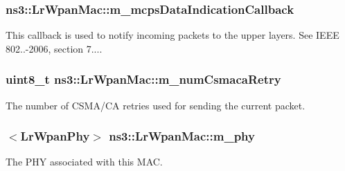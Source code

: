 \subsubsection[{\texorpdfstring{m\+\_\+mcps\+Data\+Indication\+Callback}{m_mcpsDataIndicationCallback}}]{ ns3\+::\+Lr\+Wpan\+Mac\+::m\+\_\+mcps\+Data\+Indication\+Callback\hspace{0.3cm}{\ttfamily [private]}}\hypertarget{classns3_1_1LrWpanMac_ada2124716389b849b2a1f9c8ff64d597}{}\label{classns3_1_1LrWpanMac_ada2124716389b849b2a1f9c8ff64d597}
This callback is used to notify incoming packets to the upper layers. See I\+E\+EE 802..-\/2006, section 7.... 
\subsubsection[{\texorpdfstring{m\+\_\+num\+Csmaca\+Retry}{m_numCsmacaRetry}}]{\setlength{\rightskip}{0pt plus 5cm}uint8\+\_\+t ns3\+::\+Lr\+Wpan\+Mac\+::m\+\_\+num\+Csmaca\+Retry\hspace{0.3cm}{\ttfamily [private]}}\hypertarget{classns3_1_1LrWpanMac_a1859006076f65683c1fa442375d706a6}{}\label{classns3_1_1LrWpanMac_a1859006076f65683c1fa442375d706a6}
The number of C\+S\+M\+A/\+CA retries used for sending the current packet. 
\subsubsection[{\texorpdfstring{m\+\_\+phy}{m_phy}}]{$<${\bf Lr\+Wpan\+Phy}$>$ ns3\+::\+Lr\+Wpan\+Mac\+::m\+\_\+phy\hspace{0.3cm}{\ttfamily [private]}}\hypertarget{classns3_1_1LrWpanMac_ae3184afcbda99342d45c0b7e6cf9f33a}{}\label{classns3_1_1LrWpanMac_ae3184afcbda99342d45c0b7e6cf9f33a}
The P\+HY associated with this M\+AC. 
